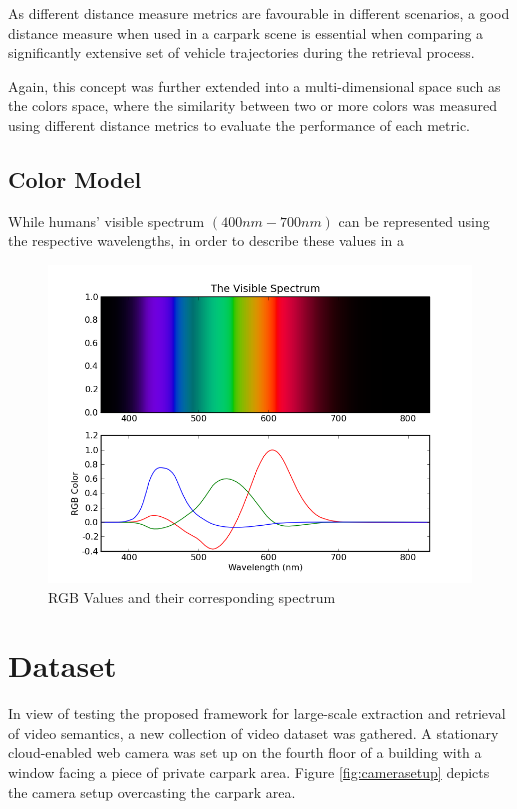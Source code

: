 As different distance measure metrics are favourable in different scenarios, a good distance measure when used in a carpark scene is essential when comparing a significantly extensive set of vehicle trajectories during the retrieval process.   

Again, this concept was further extended into a multi-dimensional space such as the colors space, where the similarity between two or more colors was measured using different distance metrics to evaluate the performance of each metric. 



\subsection{Color Model}

While humans' visible spectrum $(400nm - 700nm)$ can be represented using the respective wavelengths,  in order to describe these values in a 


\begin{figure}[hbt!]\centering
\includegraphics[width=.7\textwidth]{image/general/VisibleSpectrum.png}
\caption{RGB Values and their corresponding spectrum}
\label{fig:distanceMeasure}
\end{figure}





\section{Dataset}
\label{section:dataset_used}

In view of testing the proposed framework for large-scale extraction and retrieval of video semantics, a new collection of video dataset was gathered. A stationary cloud-enabled web camera was set up on the fourth floor of a building with a window facing a piece of private carpark area. Figure \ref{fig:camerasetup} depicts the camera setup overcasting the carpark area. 

